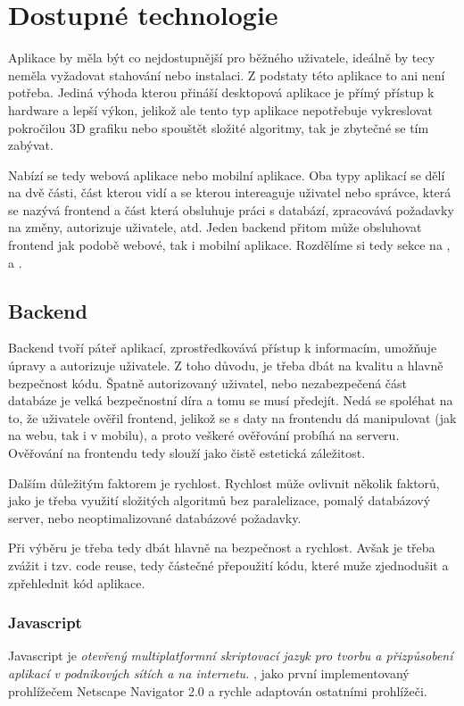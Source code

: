\section{Dostupné technologie}
\label{sc:available_technologies}
Aplikace by měla být co nejdostupnější pro běžného uživatele, ideálně by tecy neměla vyžadovat stahování nebo instalaci. Z podstaty této aplikace to ani není potřeba. Jediná výhoda kterou přináší desktopová aplikace je přímý přístup k hardware a lepší výkon, jelikož ale tento typ aplikace nepotřebuje vykreslovat pokročilou 3D grafiku nebo spouštět složité algoritmy, tak je zbytečné se tím zabývat.

Nabízí se tedy webová aplikace nebo mobilní aplikace. Oba typy aplikací se dělí na dvě části, část kterou vidí a se kterou intereaguje uživatel nebo správce, která se nazývá frontend a část která obsluhuje práci s databází, zpracovává požadavky na změny, autorizuje uživatele, atd. Jeden backend přitom může obsluhovat frontend jak podobě webové, tak i mobilní aplikace. Rozdělíme si tedy sekce na ,  a .

\subsection{Backend}
\label{ss:backend}
Backend tvoří páteř aplikací, zprostředkovává přístup k informacím, umožňuje úpravy a autorizuje uživatele. Z toho důvodu, je třeba dbát na kvalitu a hlavně bezpečnost kódu. Špatně autorizovaný uživatel, nebo nezabezpečená část databáze je velká bezpečnostní díra a tomu se musí předejít. Nedá se spoléhat na to, že uživatele ověřil frontend, jelikož se s daty na frontendu dá manipulovat (jak na webu, tak i v mobilu), a proto veškeré ověřování probíhá na serveru. Ověřování na frontendu tedy slouží jako čistě estetická záležitost.

Dalším důležitým faktorem je rychlost. Rychlost může ovlivnit několik faktorů, jako je třeba využití složitých algoritmů bez paralelizace, pomalý databázový server, nebo neoptimalizované databázové požadavky.

Při výběru je třeba tedy dbát hlavně na bezpečnost a rychlost. Avšak je třeba zvážit i tzv. code reuse, tedy částečné přepoužití kódu, které muže zjednodušit a zpřehlednit kód aplikace.

\subsubsection*{Javascript}
Javascript je \textit{otevřený multiplatformní skriptovací jazyk pro tvorbu a přizpůsobení aplikací v podnikových sítích a na internetu.} \cite{netscapecommunicationscorporation_1995_press}, jako první implementovaný prohlížečem Netscape Navigator 2.0 a rychle adaptován ostatními prohlížeči.

